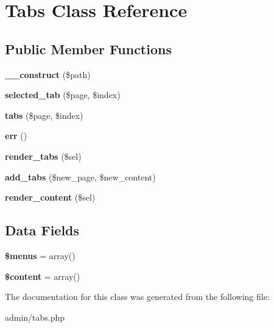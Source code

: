 \hypertarget{class_tabs}{}\section{Tabs Class Reference}
\label{class_tabs}
\subsection*{Public Member Functions}
\begin{DoxyCompactItemize}
\item 
\hypertarget{class_tabs_a03853ceaa393e487835b287de58aba5a}{}{\bfseries \+\_\+\+\_\+construct} (\$path)\label{class_tabs_a03853ceaa393e487835b287de58aba5a}

\item 
\hypertarget{class_tabs_a03a3c5bc8af0ae1ebbac0efcdd98e6ae}{}{\bfseries selected\+\_\+tab} (\$page, \$index)\label{class_tabs_a03a3c5bc8af0ae1ebbac0efcdd98e6ae}

\item 
\hypertarget{class_tabs_ac14a3201b26c45d640fac60c0d840ff8}{}{\bfseries tabs} (\$page, \$index)\label{class_tabs_ac14a3201b26c45d640fac60c0d840ff8}

\item 
\hypertarget{class_tabs_aa5da7dbb221d92319dd6830c9ca98b00}{}{\bfseries err} ()\label{class_tabs_aa5da7dbb221d92319dd6830c9ca98b00}

\item 
\hypertarget{class_tabs_adae49c3f11ac1991d6913d2ef1766f05}{}{\bfseries render\+\_\+tabs} (\$sel)\label{class_tabs_adae49c3f11ac1991d6913d2ef1766f05}

\item 
\hypertarget{class_tabs_a06bc1d223f7380016b437769668916b8}{}{\bfseries add\+\_\+tabs} (\$new\+\_\+page, \$new\+\_\+content)\label{class_tabs_a06bc1d223f7380016b437769668916b8}

\item 
\hypertarget{class_tabs_a6c5cd4b52a9da7da6bdc7ad5ae4e5868}{}{\bfseries render\+\_\+content} (\$sel)\label{class_tabs_a6c5cd4b52a9da7da6bdc7ad5ae4e5868}

\end{DoxyCompactItemize}
\subsection*{Data Fields}
\begin{DoxyCompactItemize}
\item 
\hypertarget{class_tabs_a681cf86fb2440a8c89c88603a08670ba}{}{\bfseries \$menus} = array()\label{class_tabs_a681cf86fb2440a8c89c88603a08670ba}

\item 
\hypertarget{class_tabs_a57b284fe00866494b33afa80ba729bed}{}{\bfseries \$content} = array()\label{class_tabs_a57b284fe00866494b33afa80ba729bed}

\end{DoxyCompactItemize}


The documentation for this class was generated from the following file\+:\begin{DoxyCompactItemize}
\item 
admin/tabs.\+php\end{DoxyCompactItemize}
